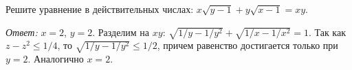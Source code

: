 \problem
Решите уравнение в действительных числах:
$x \sqrt{y - 1} + y \sqrt{x - 1} = x y$.

\solution
\emph{Ответ:} $x = 2$, $y = 2$.
Разделим на $x y$:
$\sqrt{1 / y - 1 / y^2} + \sqrt{1 / x - 1 / x^2} = 1$.
Так как $z - z^2 \leq 1 / 4$, то $\sqrt{1 / y - 1 / y^2} \leq 1 / 2$, причем
равенство достигается только при $y = 2$.
Аналогично $x = 2$.

\endproblem
